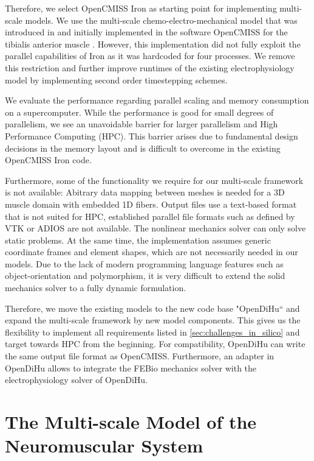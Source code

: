 Therefore, we select OpenCMISS Iron as starting point for implementing multi-scale models. We use the multi-scale chemo-electro-mechanical model that was introduced in \cite{Roehrle2012} and initially implemented in the software OpenCMISS for the tibialis anterior muscle \cite{Heidlauf2013}. However, this implementation did not fully exploit the parallel capabilities of Iron as it was hardcoded for four processes. We remove this restriction and further improve runtimes of the existing electrophysiology model by implementing second order timestepping schemes.

We evaluate the performance regarding parallel scaling and memory consumption on a supercomputer. While the performance is good for small degrees of parallelism, we see an unavoidable barrier for larger parallelism and High Performance Computing (HPC). This barrier arises due to fundamental design decisions in the memory layout and is difficult to overcome in the existing OpenCMISS Iron code.

Furthermore, some of the functionality we require for our multi-scale framework is not available: Abitrary data mapping between meshes is needed for a 3D muscle domain with embedded 1D fibers. Output files use a text-based format that is not suited for HPC, established parallel file formats such as defined by VTK or ADIOS are not available. The nonlinear mechanics solver can only solve static problems. At the same time, the implementation assumes generic coordinate frames and element shapes, which are not necessarily needed in our models. Due to the lack of modern programming language features such as object-orientation and polymorphism, it is very difficult to extend the solid mechanics solver to a fully dynamic formulation.

Therefore, we move the existing models to the new code base "OpenDiHu`` and expand the multi-scale framework by new model components. This gives us the flexibility to implement all requirements listed in \cref{sec:challenges_in_silico} and target towards HPC from the beginning. For compatibility, OpenDiHu can write the same output file format as OpenCMISS. Furthermore, an adapter in OpenDiHu allows to integrate the FEBio mechanics solver with the electrophysiology solver of OpenDiHu.

\section{The Multi-scale Model of the Neuromuscular System}\label{sec:the_multi_scale_model_of}

